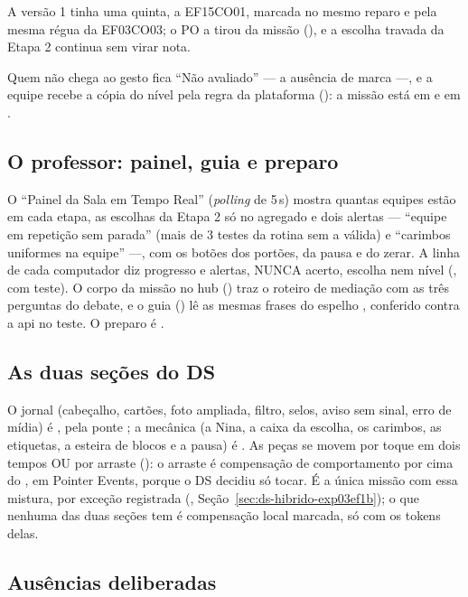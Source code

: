 A versão 1 tinha uma quinta, a EF15CO01, marcada no mesmo reparo e pela
mesma régua da EF03CO03; o PO a tirou da missão (), e a escolha
travada da Etapa 2 continua sem virar nota.

Quem não chega ao gesto fica \enquote{Não avaliado} --- a ausência de marca
---, e a equipe recebe a cópia do nível pela regra da plataforma
(): a missão está em  e em
.

\subsection{O professor: painel, guia e preparo}

O \enquote{Painel da Sala em Tempo Real} (\emph{polling} de 5\,s) mostra
quantas equipes estão em cada etapa, as escolhas da Etapa 2 só no agregado e
dois alertas --- \enquote{equipe em repetição sem parada} (mais de 3 testes
da rotina sem a válida) e \enquote{carimbos uniformes na equipe} ---, com os
botões dos portões, da pausa e do zerar. A linha de cada computador diz
progresso e alertas, NUNCA acerto, escolha nem nível
(, com teste). O corpo da missão no hub
() traz o roteiro de mediação com as três
perguntas do debate, e o guia () lê
as mesmas frases do espelho , conferido contra
a api no teste. O preparo é .

\subsection{As duas seções do DS}

O jornal (cabeçalho, cartões, foto ampliada, filtro, selos, aviso sem sinal,
erro de mídia) é , pela ponte ; a
mecânica (a Nina, a caixa da escolha, os carimbos, as etiquetas, a esteira de
blocos e a pausa) é . As peças se movem por toque em dois tempos
OU por arraste (): o arraste é compensação de comportamento por
cima do , em Pointer Events, porque o DS decidiu só tocar. É a única missão com essa mistura,
por exceção registrada (, Seção~\ref{sec:ds-hibrido-exp03ef1b});
o que nenhuma das duas seções tem é compensação local marcada, só com os
tokens delas.

\subsection{Ausências deliberadas}

